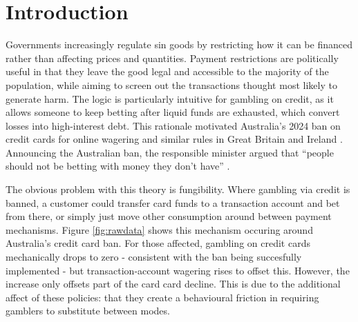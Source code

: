 \documentclass[12pt]{article}
\begin{document}
\clearpage
\hypersetup{pageanchor=true}
\onehalfspacing
{}

\section{Introduction}\label{sec:introduction}

Governments increasingly regulate sin goods by restricting how it can be financed rather than affecting prices and quantities. Payment restrictions are politically useful in that they leave the good legal and accessible to the majority of the population, while aiming to screen out the transactions thought most likely to generate harm. The logic is particularly intuitive for gambling on credit, as it allows someone to keep betting after liquid funds are exhausted, which convert losses into high-interest debt. This rationale motivated Australia's 2024 ban on credit cards for online wagering and similar rules in Great Britain and Ireland \citep{Rowland_credit_cards_ban_2024,GamblingCommission2020_CreditCardBan,IrelandGamblingRegulationAct2024}. Announcing the Australian ban, the responsible minister argued that ``people should not be betting with money they don't have'' \citep{Rowland_credit_cards_ban_2024}. %

The obvious problem with this theory is fungibility. Where gambling via credit is banned, a customer could transfer card funds to a transaction account and bet from there, or simply just move other consumption around between payment mechanisms. %
Figure \ref{fig:rawdata} shows this mechanism occuring around Australia's credit card ban. For those affected, gambling on credit cards mechanically drops to zero - consistent with the ban being succesfully implemented - but transaction-account wagering rises to offset this. However, the increase only offsets part of the card card decline. This is due to the additional affect of these policies: that they create a behavioural friction in requiring gamblers to substitute between modes.
\end{document}
